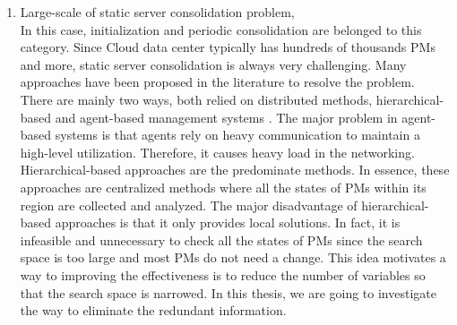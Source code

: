 \begin{enumerate}


\item Large-scale of static server consolidation problem, \\
	In this case, initialization and periodic consolidation are belonged to this category. 
	Since Cloud data center typically has hundreds of thousands PMs and more, static server consolidation is always very challenging. Many approaches have been proposed in the literature to resolve the problem. There are mainly two ways, both relied on distributed methods, hierarchical-based \cite{Jung:2010dt, Moens:2011gk} and agent-based management systems \cite{Yazir:2010bk}.
	The major problem in agent-based systems is that agents rely on heavy communication to maintain a high-level utilization. Therefore, it causes heavy load in the networking. 
	Hierarchical-based approaches are the predominate methods. In essence, these approaches are centralized methods where all the states of PMs within its region are collected and analyzed. The major disadvantage of hierarchical-based approaches is that it only provides local solutions. In fact, it is infeasible and unnecessary to check all the states of PMs since the search space is too large and most PMs do not need a change. This idea
	motivates a way to improving the effectiveness is to reduce the number of variables so that the search space is narrowed. In this thesis, we are going to investigate the way to eliminate the redundant information.
\end{enumerate}



